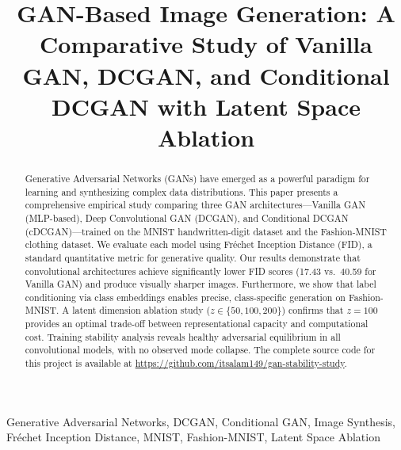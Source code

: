 \documentclass[conference]{IEEEtran}
\begin{document}
\title{GAN-Based Image Generation: A Comparative Study of Vanilla GAN, DCGAN, and Conditional DCGAN with Latent Space Ablation}

\author{
\and
{}
}

\maketitle

\begin{abstract}
Generative Adversarial Networks (GANs) have emerged as a powerful paradigm for learning and synthesizing complex data distributions. This paper presents a comprehensive empirical study comparing three GAN architectures---Vanilla GAN (MLP-based), Deep Convolutional GAN (DCGAN), and Conditional DCGAN (cDCGAN)---trained on the MNIST handwritten-digit dataset and the Fashion-MNIST clothing dataset. We evaluate each model using Fréchet Inception Distance (FID), a standard quantitative metric for generative quality. Our results demonstrate that convolutional architectures achieve significantly lower FID scores (17.43 vs.\ 40.59 for Vanilla GAN) and produce visually sharper images. Furthermore, we show that label conditioning via class embeddings enables precise, class-specific generation on Fashion-MNIST. A latent dimension ablation study ($z \in \{50, 100, 200\}$) confirms that $z=100$ provides an optimal trade-off between representational capacity and computational cost. Training stability analysis reveals healthy adversarial equilibrium in all convolutional models, with no observed mode collapse. The complete source code for this project is available at \url{https://github.com/itsalam149/gan-stability-study}.
\end{abstract}

\begin{IEEEkeywords}
Generative Adversarial Networks, DCGAN, Conditional GAN, Image Synthesis, Fréchet Inception Distance, MNIST, Fashion-MNIST, Latent Space Ablation
\end{IEEEkeywords}
\end{document}
